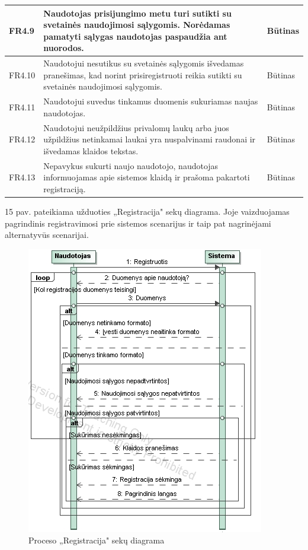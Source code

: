 \documentclass{VUMIFPSkursinis}
\begin{document}
\begin{table}[H]
\centering
\normalsize
\begin{tabular}{|p{2cm}|p{10cm}|p{3cm}|}
\hline

FR4.9 & \multicolumn{1}{m{10cm}|}{Naudotojas  prisijungimo metu turi sutikti su svetainės naudojimosi sąlygomis. Norėdamas pamatyti sąlygas naudotojas paspaudžia ant nuorodos.} & Būtinas \\ \hline
FR4.10 & \multicolumn{1}{m{10cm}|}{Naudotojui nesutikus su svetainės sąlygomis išvedamas pranešimas, kad norint prisiregistruoti reikia sutikti su svetainės naudojimosi sąlygomis.} & Būtinas \\ \hline
FR4.11 & \multicolumn{1}{m{10cm}|}{Naudotojui  suvedus tinkamus duomenis sukuriamas naujas naudotojas.} & Būtinas \\ \hline
FR4.12 & \multicolumn{1}{m{10cm}|}{Naudotojui neužpildžius privalomų laukų arba juos užpildžius netinkamai laukai yra nuspalvinami raudonai ir išvedamas klaidos tekstas.} & Būtinas \\ \hline
FR4.13 & \multicolumn{1}{m{10cm}|}{Nepavykus sukurti naujo naudotojo, naudotojas informuojamas apie sistemos klaidą ir prašoma pakartoti registraciją.} & Būtinas \\ \hline
\end{tabular}
\end{table}
15 pav. pateikiama užduoties „Registracija" sekų diagrama. Joje vaizduojamas pagrindinis registravimosi prie sistemos scenarijus ir taip pat nagrinėjami alternatyvūs scenarijai.
\begin{figure}[H]
\centering
\includegraphics[scale=1, frame]{img/registracija.png}
\caption{Proceso „Registracija" sekų diagrama}
\end{figure}
\end{document}
